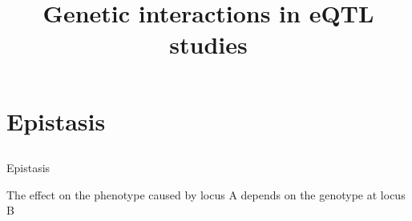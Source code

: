 \documentclass{beamer}
\title[Epistasis in GWAS]{Genetic interactions in eQTL studies}
\date{}
\begin{document}

\begin{frame}
\titlepage
\end{frame}


\section{Epistasis}
\subsection{}

\begin{frame}{Epistasis}
\begin{definition}
{\color{orange} The effect on the phenotype caused by locus A depends on the genotype at locus B }
\end{definition}
\end{frame}
\end{document}
